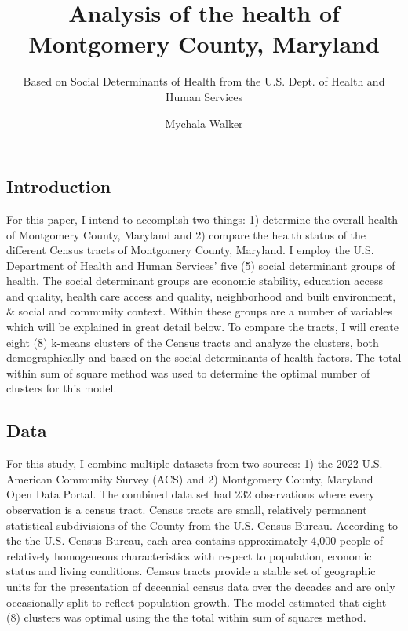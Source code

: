 \documentclass[
  letterpaper,
  DIV=11,
  numbers=noendperiod]{scrartcl}
\title{Analysis of the health of Montgomery County, Maryland}
\subtitle{Based on Social Determinants of Health from the U.S. Dept. of
Health and Human Services}
\author{Mychala Walker}
\date{}
\begin{document}
\maketitle

\subsection{Introduction}\label{introduction}

For this paper, I intend to accomplish two things: 1) determine the
overall health of Montgomery County, Maryland and 2) compare the health
status of the different Census tracts of Montgomery County, Maryland. I
employ the U.S. Department of Health and Human Services' five (5) social
determinant groups of health. The social determinant groups are economic
stability, education access and quality, health care access and quality,
neighborhood and built environment, \& social and community context.
Within these groups are a number of variables which will be explained in
great detail below. To compare the tracts, I will create eight (8)
k-means clusters of the Census tracts and analyze the clusters, both
demographically and based on the social determinants of health factors.
The total within sum of square method was used to determine the optimal
number of clusters for this model.

\subsection{Data}\label{data}

For this study, I combine multiple datasets from two sources: 1) the
2022 U.S. American Community Survey (ACS) and 2) Montgomery County,
Maryland Open Data Portal. The combined data set had 232 observations
where every observation is a census tract. Census tracts are small,
relatively permanent statistical subdivisions of the County from the
U.S. Census Bureau. According to the the U.S. Census Bureau, each area
contains approximately 4,000 people of relatively homogeneous
characteristics with respect to population, economic status and living
conditions. Census tracts provide a stable set of geographic units for
the presentation of decennial census data over the decades and are only
occasionally split to reflect population growth. The model estimated
that eight (8) clusters was optimal using the the total within sum of
squares method.
\end{document}
